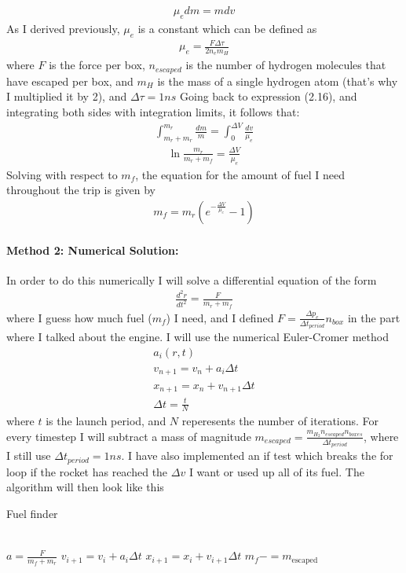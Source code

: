\documentclass[a4paper,11pt,english]{report}
\begin{document}
\begin{align}
  \mu_{e}dm = mdv
\end{align}
As I derived previously, \(\mu_{e}\) is a constant which can be defined as
\begin{align}
  \mu_{e} = \frac{F\Delta \tau}{2n_{e}m_{H}}
\end{align}
where \(F\) is the force per box, \(n_{escaped}\) is the number
of hydrogen molecules that have escaped per box,  and \(m_{H}\) is the mass of a
single hydrogen atom (that's why I multiplied it by 2), and \(\Delta \tau = 1ns\)
Going back to expression (2.16), and integrating both sides with
integration limits, it follows that:
\begin{align}
  \int_{ m_{r} + m_{r}}^{m_{r}}\frac{dm}{m}= \int_{0}^{\Delta
  V}\frac{dv}{\mu_{e}}
\end{align}
\vspace{3mm}
\begin{align}
  \ln{\frac{m_{r}}{m_{r} + m_{f}}} = \frac{\Delta V}{\mu_{e}}
\end{align}
Solving with respect to \(m_{f}\), the equation for the amount of fuel I need
throughout the trip is given by
\begin{align}
  m_{f} = m_{r}(e^{{-\frac{\Delta V}{\mu_{e}}}} -1)
\end{align}
\paragraph{Method 2: Numerical Solution:} In order to do this numerically I will
solve a differential equation of the form
\begin{align}
  \frac{d^{2}r}{dt^{2}} = \frac{F}{m_{r}+m_{f}}
\end{align}
where I guess how much fuel (\(m_{f}\)) I need, and I defined 
\(F = \frac{\Delta p_{e}}{\Delta t_{period}}n_{box}\) in the part where I talked about
the engine. I will use the numerical Euler-Cromer method
\begin{align*}
  a_{i}(r,t)
  \\
  v_{n+1} = v_{n} + a_{i}\Delta t
  \\
  x_{n+1} = x_{n} + v_{n+1}\Delta t
  \\
  \Delta t =  \frac{t}{N}
\end{align*}
where \(t\) is the launch period, and \(N\) reperesents the number of iterations. For
every timestep I will subtract  a mass of magnitude
\(m_{escaped} = \frac{m_{H_{2}}n_{escaped}n_{boxes}}{\Delta t_{period}}\), where I
still use \(\Delta t_{period} = 1ns\). I have also implemented an if test which
breaks the for loop if the rocket has reached the \(\Delta v\) I want or used up
all of its fuel. The algorithm will then look like this
\begin{algorithm}
  \caption{Fuel finder}
  \label{CHalgorithm}
  \begin{algorithmic}[1]
    \\
    \State \(a = \frac{F}{m_{f} + m_{r}}\)
    \State \(v_{i + 1} = v_{i}  + a_{i}\Delta t\)
    \State \(x_{i + 1} = x_{i} + v_{i + 1}\Delta t\)
  \State \(m_{f} -= m_{\mathrm{escaped}}\) 
    \EndFor
  \end{algorithmic}
\end{algorithm}
\end{document}
